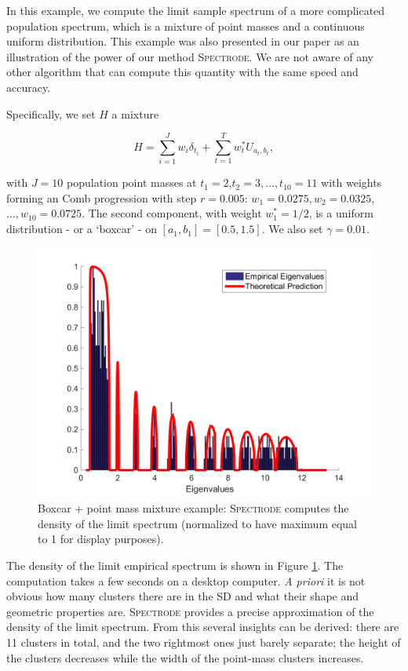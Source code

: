 \documentclass[english,11pt]{article} %
\begin{document}
In this example, we compute the limit sample spectrum of a more complicated population spectrum, which is a mixture of point masses and a continuous uniform distribution. This example was also presented in our paper \cite{dobriban2015efficient} as an illustration of the power of our method \textsc{Spectrode}. We are not aware of any other algorithm that can compute this quantity with the same speed and accuracy.

Specifically, we set $H$ a mixture

\begin{equation*}
\label{uniform_atomic}
H = \sum_{i=1}^{J} w_i \delta_{t_i} + \sum_{t=1}^{T} w^*_t U_{a_t,b_t} ,
\end{equation*}

with $J=10$ population point masses at $t_1=2$,$t_2=3,\ldots,t_{10}=11$ with weights forming an Comb progression with step $r = 0.005$: $w_1=0.0275, w_2=0.0325$,$\ldots, w_{10}=0.0725$. The second component, with weight $w^*_1=1/2$, is a uniform distribution - or a `boxcar' - on $[a_1,b_1]=[0.5,1.5]$.  We also set $\gamma=0.01$.


\begin{figure}
\centering
  \includegraphics[scale=0.45]{"../Experiments/Examples/Illustration_mixture_3"}
\caption{Boxcar + point mass mixture example: \textsc{Spectrode} computes  the density of the limit spectrum (normalized to have maximum equal to 1 for display purposes).}
\label{example_2}
\end{figure}

The density of the limit empirical spectrum is shown in Figure \ref{example_2}. The computation takes a few seconds on a desktop computer. \emph{A priori} it is not obvious how many clusters there are in the SD and what their shape and geometric properties are. \textsc{Spectrode} provides a precise approximation of the density of the limit spectrum. From this several insights can be derived: there are 11 clusters in total, and the two rightmost ones just barely separate; the height of the clusters decreases while the width of the point-mass clusters increases.
\end{document}

